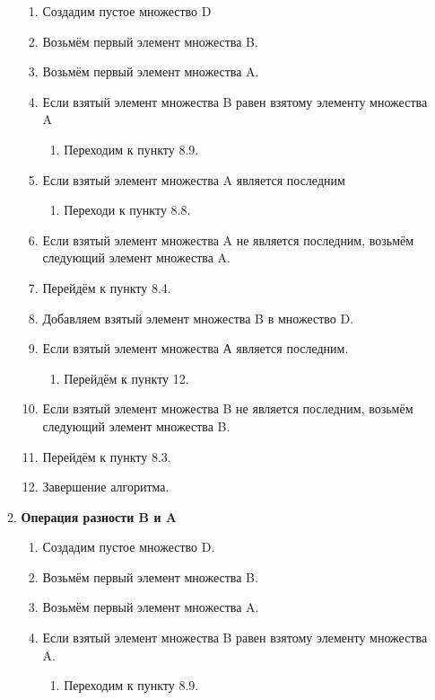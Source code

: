 \documentclass[a4paper,12pt]{extarticle}
\begin{document}
\begin{enumerate}
\begin{enumerate}[label*=\arabic*.]
\begin{enumerate}[label*=\arabic*.]
    \item Создадим пустое множество D
    \item Возьмём первый элемент множества B.
    \item Возьмём первый элемент множества A.
    \item Если взятый элемент множества B равен взятому элементу множества A
    \begin{enumerate}[label*=\arabic*.]
      \item Переходим к пункту 8.9.
    \end{enumerate}
    \item Если взятый элемент множества A является последним
    \begin{enumerate}[label*=\arabic*.]
      \item Переходи к пункту 8.8.
    \end{enumerate}
    \item Если взятый элемент множества A не является последним, возьмём следующий элемент множества A.
    \item Перейдём к пункту 8.4.
    \item Добавляем взятый элемент множества B в множество D.
    \item Если взятый элемент множества А является последним.
    \begin{enumerate}[label*=\arabic*.]
      \item Перейдём к пункту 12.
    \end{enumerate}
    \item Если взятый элемент множества B не является последним, возьмём следующий элемент множества B.
    \item Перейдём к пункту 8.3.
    \item Завершение алгоритма.
  \end{enumerate}
  \item\textbf{Операция разности B и A}
  \begin{enumerate}[label*=\arabic*.]
    \item Создадим пустое множество D.
    \item Возьмём первый элемент множества B.
    \item Возьмём первый элемент множества A.
    \item Если взятый элемент множества B равен взятому элементу множества A.
    \begin{enumerate}[label*=\arabic*.]
      \item Переходим к пункту 8.9.
    \end{enumerate}

\end{enumerate}
\end{enumerate}
\end{enumerate}
\end{document}
